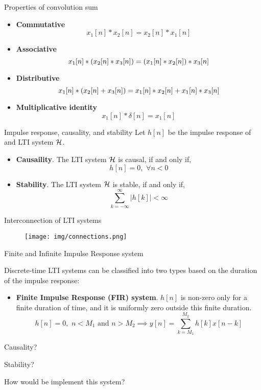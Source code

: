 \documentclass[aspectratio=169]{beamer}
\let\olditem\item
\renewcommand{\item}{\setlength{\itemsep}{\fill}\olditem}
\def\mc{\ensuremath\mathcal}
\def\lp{\ensuremath\left(}
\def\rp{\ensuremath\right)}
\begin{document}
\begin{frame}[t]{Properties of convolution sum}
\begin{itemize}
  \item \textbf{Commutative}
  \[ x_1[n] * x_2[n] = x_2[n] * x_1[n] \]
  \item \textbf{Associative}
  \[ x_1[n] * \lp x_2[n] * x_3[n]\rp = \lp x_1[n] * x_2[n]\rp * x_3[n] \]
  \item \textbf{Distributive}
  \[ x_1[n] * \lp x_2[n] + x_3[n]\rp = x_1[n] * x_2[n] + x_1[n] * x_3[n] \]
  \item \textbf{Multiplicative identity}
  \[ x_1[n] * \delta[n] = x_1[n] \]
\end{itemize}
\end{frame}


\begin{frame}[t]{Impulse response, causality, and stability}
Let $h[n]$ be the impulse response of and LTI system $\mc{H}$. \vspace{0.5cm}

\begin{itemize}
  \item \textbf{Causaility}. The LTI system $\mc{H}$ is causal, if and only if,
  \[ h[n] = 0, \,\, \forall n < 0 \]
  \item \textbf{Stability}. The LTI system $\mc{H}$ is stable, if and only if,
  \[ \sum_{k=-\infty}^{\infty} \vert h[k] \vert < \infty \]
\end{itemize}
\end{frame}



\begin{frame}[t]{Interconnection of LTI systems}

\begin{figure}
\texttt{[image: img/connections.png]}
\end{figure}

\end{frame}

\begin{frame}[t]{Finite and Infinite Impulse Response system}

Discrete-time LTI systems can be classified into two types based on the duration of the impulse response:
\begin{itemize}
  \item \textbf{Finite Impulse Response (FIR) system}. $h[n]$ is non-zero only for a finite duration of time, and it is uniformly zero outside this finite duration.
  \[ h[n] = 0, \,\, n < M_1 \,\, \text{and} \,\, n > M_2 \implies y[n] = \sum_{k=M_1}^{M_2} h[k]x[n-k] \]
\end{itemize}

Causality? \vspace{0.5cm}

Stability?

How would be implement this system?

\end{frame}
\end{document}
